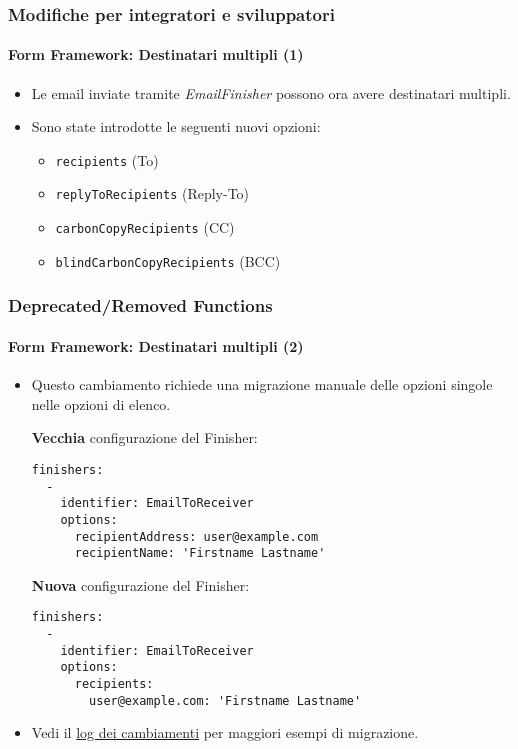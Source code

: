 \begin{frame}[fragile]
	\frametitle{Modifiche per integratori e sviluppatori}
	\framesubtitle{Form Framework: Destinatari multipli (1)}

	\begin{itemize}
		\item Le email inviate tramite \textit{EmailFinisher} possono ora avere destinatari multipli.

		\item Sono state introdotte le seguenti nuovi opzioni:

			\begin{itemize}
				\item \texttt{recipients} (To)
				\item \texttt{replyToRecipients} (Reply-To)
				\item \texttt{carbonCopyRecipients} (CC)
				\item \texttt{blindCarbonCopyRecipients} (BCC)
			\end{itemize}

	\end{itemize}

\end{frame}


\begin{frame}[fragile]
	\frametitle{Deprecated/Removed Functions}
	\framesubtitle{Form Framework: Destinatari multipli (2)}

	\lstset{basicstyle=\tiny\ttfamily}

	\begin{itemize}
		\item Questo cambiamento richiede una migrazione manuale delle opzioni singole nelle opzioni di elenco.

		\smaller\textbf{Vecchia} configurazione del Finisher:\normalsize

\begin{lstlisting}
finishers:
  -
    identifier: EmailToReceiver
    options:
      recipientAddress: user@example.com
      recipientName: 'Firstname Lastname'
\end{lstlisting}

		\smaller\textbf{Nuova} configurazione del Finisher:\normalsize

\begin{lstlisting}
finishers:
  -
    identifier: EmailToReceiver
    options:
      recipients:
        user@example.com: 'Firstname Lastname'
\end{lstlisting}

		\item Vedi il \href{https://docs.typo3.org/c/typo3/cms-core/10.0/en-us/Changelog/master/Deprecation-80420-EmailFinisherSingleAddressOptions.html}{log dei cambiamenti}
			per maggiori esempi di migrazione.

	\end{itemize}

\end{frame}


